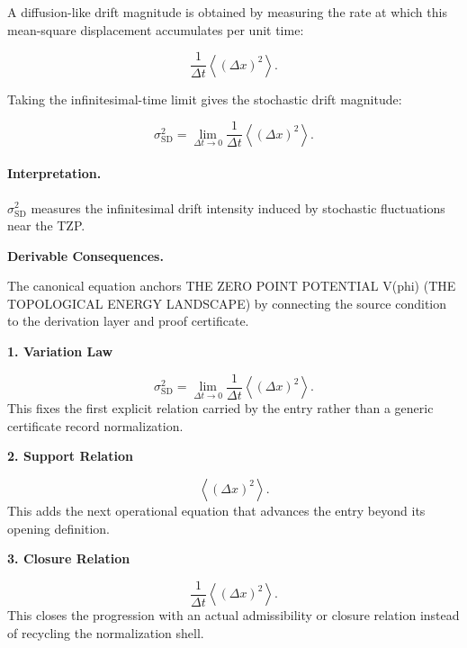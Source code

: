 A diffusion-like drift magnitude is obtained by measuring the rate at which this mean-square displacement accumulates per unit time:

\begin{equation}
\frac{1}{\Delta t}
\left\langle(\Delta x)^2\right\rangle .
\end{equation}

Taking the infinitesimal-time limit gives the stochastic drift magnitude:

\begin{equation}
\boxed{
\sigma_{\mathrm{SD}}^{2}
=
\lim_{\Delta t\to 0}
\frac{1}{\Delta t}
\left\langle
(\Delta x)^2
\right\rangle .
}
\end{equation}

\paragraph{Interpretation.}
$\sigma_{\mathrm{SD}}^{2}$ measures the infinitesimal drift intensity induced by stochastic fluctuations near the TZP.

\par\vspace{0.35em}
\noindent\textbf{Derivable Consequences.}\quad
\begingroup
\footnotesize
\raggedright
The canonical equation anchors THE ZERO POINT POTENTIAL V(phi) (THE TOPOLOGICAL ENERGY LANDSCAPE) by connecting the source condition to the derivation layer and proof certificate.
\par\endgroup

\noindent\textbf{1. Variation Law}\par
\[
\sigma_{\mathrm{SD}}^{2} = \lim_{\Delta t\to 0} \frac{1}{\Delta t} \left\langle (\Delta x)^2 \right\rangle.
\]
\noindent This fixes the first explicit relation carried by the entry rather than a generic certificate record normalization.\par
\noindent\textbf{2. Support Relation}\par
\[
\left\langle(\Delta x)^2\right\rangle.
\]
\noindent This adds the next operational equation that advances the entry beyond its opening definition.\par
\noindent\textbf{3. Closure Relation}\par
\[
\frac{1}{\Delta t} \left\langle(\Delta x)^2\right\rangle.
\]
\noindent This closes the progression with an actual admissibility or closure relation instead of recycling the normalization shell.\par

